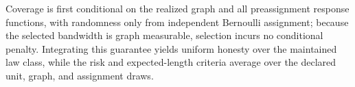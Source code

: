 Coverage is first conditional on the realized graph and all preassignment response functions, with randomness only from independent Bernoulli assignment; because the selected bandwidth is graph measurable, selection incurs no conditional penalty.  Integrating this guarantee yields uniform honesty over the maintained law class, while the risk and expected-length criteria average over the declared unit, graph, and assignment draws.